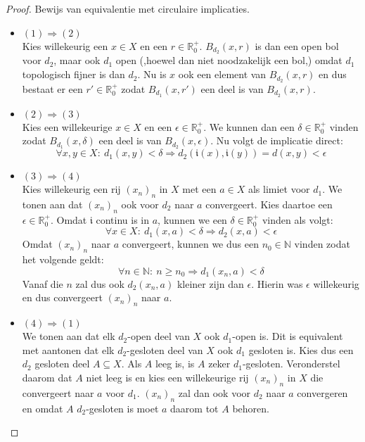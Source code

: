 \documentclass[main.tex]{subfiles}
\begin{document}
\begin{st}
  \begin{proof}
    Bewijs van equivalentie met circulaire implicaties.
    \begin{itemize}
    \item $(1) \Rightarrow (2)$\\
      Kies willekeurig een $x \in X$ en een $r\in \mathbb{R}_{0}^{+}$.
      $B_{d_{2}}(x,r)$ is dan een open bol voor $d_{2}$, maar ook $d_{1}$ open (,hoewel dan niet noodzakelijk een bol,) omdat $d_{1}$ topologisch fijner is dan $d_{2}$.
      Nu is $x$ ook een element van $B_{d_{2}}(x,r)$ en dus bestaat er een $r'\in \mathbb{R}_{0}^{+}$ zodat $B_{d_{1}}(x,r')$ een deel is van $B_{d_{2}}(x,r)$.
    \item $(2) \Rightarrow (3)$\\
      Kies een willekeurige $x\in X$ en een $\epsilon \in \mathbb{R}_{0}^{+}$.
      We kunnen dan een $\delta \in \mathbb{R}_{0}^{+}$ vinden zodat $B_{d_{1}}(x,\delta)$ een deel is van $B_{d_{2}}(x,\epsilon)$.
      Nu volgt de implicatie direct:
      \[ \forall x,y\in X:\ d_{1}(x,y) < \delta \Rightarrow d_{2}(\mathfrak{i}(x),\mathfrak{i}(y)) = d(x,y) < \epsilon \]
    \item $(3) \Rightarrow (4)$\\
      Kies willekeurig een rij $(x_{n})_{n}$ in $X$ met een $a\in X$ als limiet voor $d_{1}$.
      We tonen aan dat $(x_{n})_{n}$ ook voor $d_{2}$ naar $a$ convergeert.
      Kies daartoe een $\epsilon \in \mathbb{R}_{0}^{+}$.
      Omdat $\mathfrak{i}$ continu is in $a$, kunnen we een $\delta \in \mathbb{R}_{0}^{+}$ vinden als volgt:
      \[ \forall x\in X:\ d_{1}(x,a) < \delta \Rightarrow d_{2}(x,a) < \epsilon \]
      Omdat $(x_{n})_{n}$ naar $a$ convergeert, kunnen we dus een $n_{0}\in \mathbb{N}$ vinden zodat het volgende geldt:
      \[ \forall n\in \mathbb{N}:\ n \ge n_{0} \Rightarrow d_{1}(x_{n},a) < \delta \]
      Vanaf die $n$ zal dus ook $d_{2}(x_{n},a)$ kleiner zijn dan $\epsilon$.
      Hierin was $\epsilon$ willekeurig en dus convergeert $(x_{n})_{n}$ naar $a$.
    \item $(4) \Rightarrow (1)$\\
      We tonen aan dat elk $d_{2}$-open deel van $X$ ook $d_{1}$-open is.
      Dit is equivalent met aantonen dat elk $d_{2}$-gesloten deel van $X$ ook $d_{1}$ gesloten is.
      Kies dus een $d_{2}$ gesloten deel $A \subseteq X$.
      Als $A$ leeg is, is $A$ zeker $d_{1}$-gesloten.
      Veronderstel daarom dat $A$ niet leeg is en kies een willekeurige rij $(x_{n})_{n}$ in $X$ die convergeert naar $a$ voor $d_{1}$.
      $(x_{n})_{n}$ zal dan ook voor $d_{2}$ naar $a$ convergeren en omdat $A$ $d_{2}$-gesloten is moet $a$ daarom tot $A$ behoren.
    \end{itemize}
  \end{proof}
\end{st}
\end{document}
